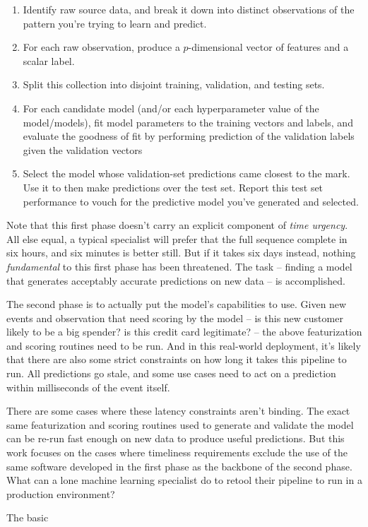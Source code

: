 \documentclass{article}
\begin{document}
\begin{enumerate}
\item Identify raw source data, and break it down into distinct observations of the pattern you're trying to learn and predict.
\item For each raw observation, produce a $p$-dimensional vector of features and a scalar label.
\item Split this collection into disjoint training, validation, and testing sets.
\item For each candidate model (and/or each hyperparameter value of the model/models), fit model parameters to the training vectors and labels, and evaluate the goodness of fit by performing prediction of the validation labels given the validation vectors
\item Select the model whose validation-set predictions came closest to the mark. Use it to then make predictions over the test set. Report this test set performance to vouch for the predictive model you've generated and selected.
\end{enumerate}

Note that this first phase doesn't carry an explicit component of \emph{time urgency}. All else equal, a typical specialist will prefer that the full sequence complete in six hours, and six minutes is better still. But if it takes six days instead, nothing \emph{fundamental} to this first phase has been threatened. The task -- finding a model that generates acceptably accurate predictions on new data -- is accomplished.

The second phase is to actually put the model's capabilities to use. Given new events and observation that need scoring by the model -- is this new customer likely to be a big spender? is this credit card legitimate? -- the above featurization and scoring routines need to be run. And in this real-world deployment, it's likely that there are also some strict constraints on how long it takes this pipeline to run. All predictions go stale, and some use cases need to act on a prediction within milliseconds of the event itself.

There are some cases where these latency constraints aren't binding. The exact same featurization and scoring routines used to generate and validate the model can be re-run fast enough on new data to produce useful predictions. But this work focuses on the cases where timeliness requirements exclude the use of the same software developed in the first phase as the backbone of the second phase. What can a lone machine learning specialist do to retool their pipeline to run in a production environment?



The basic 
\end{document}
